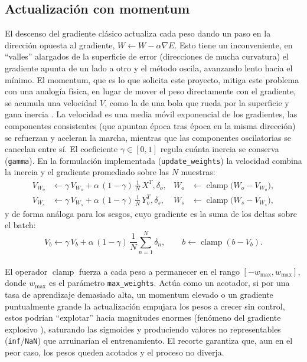 \documentclass[11pt,a4paper]{article}
\begin{document}
\subsection{Actualización con momentum}\label{sec:momentum}

El descenso del gradiente clásico actualiza cada peso dando un paso en la dirección opuesta al gradiente, $W \leftarrow W-\alpha\nabla E$.
Esto tiene un inconveniente, en ``valles'' alargados de la superficie de error (direcciones de mucha curvatura) el gradiente apunta de un lado a otro y el
método oscila, avanzando lento hacia el mínimo. El momentum, que
es lo que solicita este proyecto, mitiga este problema con una analogía física, en lugar de mover el peso directamente con el gradiente, se acumula una velocidad $V$, como la de una bola que rueda por la superficie y gana inercia \cite{polyak1964,qian1999}. La velocidad es una media móvil exponencial de los gradientes, las componentes consistentes (que apuntan
época tras época en la misma dirección) se refuerzan y aceleran la marcha,
mientras que las componentes oscilatorias se cancelan entre sí. El
coeficiente $\gamma\in[0,1]$ regula cuánta inercia se conserva
(\texttt{gamma}). En la formulación implementada (\texttt{update\_weights}) la
velocidad combina la inercia y el gradiente promediado sobre las $N$
muestras:
\begin{align}
  V_{W_o} &\leftarrow \gamma\,V_{W_o}
     + \alpha\,(1-\gamma)\,\frac{1}{N}\,X^T,\delta_o, &
  W_o &\leftarrow \operatorname{clamp}\!\bigl(W_o-V_{W_o}\bigr),
  \label{eq:upd_wo}\\
  V_{W_s} &\leftarrow \gamma\,V_{W_s}
     + \alpha\,(1-\gamma)\,\frac{1}{N}\,Y_o^T,\delta_s, &
  W_s &\leftarrow \operatorname{clamp}\!\bigl(W_s-V_{W_s}\bigr),
  \label{eq:upd_ws}
\end{align}
y de forma análoga para los sesgos, cuyo gradiente es la suma de los deltas
sobre el batch:
\begin{equation}
  V_{b}\leftarrow \gamma\,V_{b}
   + \alpha\,(1-\gamma)\,\frac{1}{N}\sum_{n=1}^{N}\delta_{n},\qquad
  b\leftarrow \operatorname{clamp}(b-V_{b}).
  \label{eq:upd_bias}
\end{equation} \\

El operador $\operatorname{clamp}$ fuerza a cada peso a permanecer en el rango
$[-w_{\max},w_{\max}]$, donde $w_{\max}$ es el parámetro \texttt{max\_weights}.
Actúa como un acotador, si por una tasa de aprendizaje
demasiado alta, un momentum elevado o un gradiente puntualmente grande la
actualización empujara los pesos a crecer sin control, estos podrían
``explotar'' hacia magnitudes enormes (fenómeno del gradiente
explosivo \cite{pascanu2013}), saturando las sigmoides y produciendo valores no
representables (\texttt{inf}/\texttt{NaN}) que arruinarían el entrenamiento. El
recorte garantiza que, aun en el peor caso, los pesos queden acotados y el
proceso no diverja. \\
\end{document}
